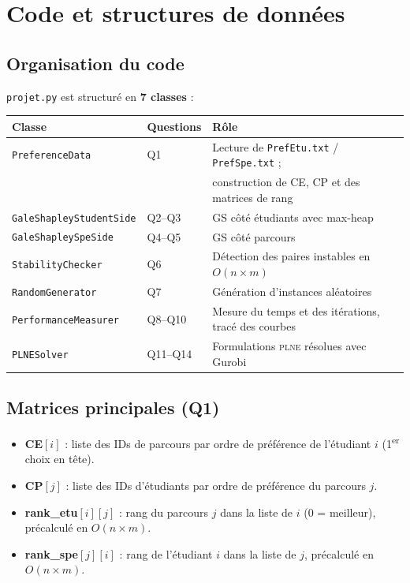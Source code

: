 \documentclass[11pt,a4paper]{article}
\newcommand{\PLNE}{\textsc{plne}}
\begin{document}
\section{Code et structures de données}

\subsection{Organisation du code}

\texttt{projet.py} est structuré en \textbf{7 classes} :

\begin{center}
\begin{tabular}{lll}
\toprule
\textbf{Classe} & \textbf{Questions} & \textbf{Rôle} \\
\midrule
\texttt{PreferenceData} & Q1 & Lecture de \texttt{PrefEtu.txt} / \texttt{PrefSpe.txt} ; \\
 & & construction de CE, CP et des matrices de rang \\
\texttt{GaleShapleyStudentSide} & Q2--Q3 & GS côté étudiants avec max-heap \\
\texttt{GaleShapleySpeSide} & Q4--Q5 & GS côté parcours \\
\texttt{StabilityChecker} & Q6 & Détection des paires instables en $O(n \times m)$ \\
\texttt{RandomGenerator} & Q7 & Génération d'instances aléatoires \\
\texttt{PerformanceMeasurer} & Q8--Q10 & Mesure du temps et des itérations, tracé des courbes \\
\texttt{PLNESolver} & Q11--Q14 & Formulations \PLNE{} résolues avec Gurobi \\
\bottomrule
\end{tabular}
\end{center}

\subsection{Matrices principales (Q1)}

\begin{itemize}
  \item \textbf{CE$[i]$} : liste des IDs de parcours par ordre de préférence de l'étudiant $i$ (1\textsuperscript{er} choix en tête).
  \item \textbf{CP$[j]$} : liste des IDs d'étudiants par ordre de préférence du parcours $j$.
  \item \textbf{rank\_etu$[i][j]$} : rang du parcours $j$ dans la liste de $i$ (0 = meilleur), précalculé en $O(n \times m)$.
  \item \textbf{rank\_spe$[j][i]$} : rang de l'étudiant $i$ dans la liste de $j$, précalculé en $O(n \times m)$.
\end{itemize}
\end{document}
